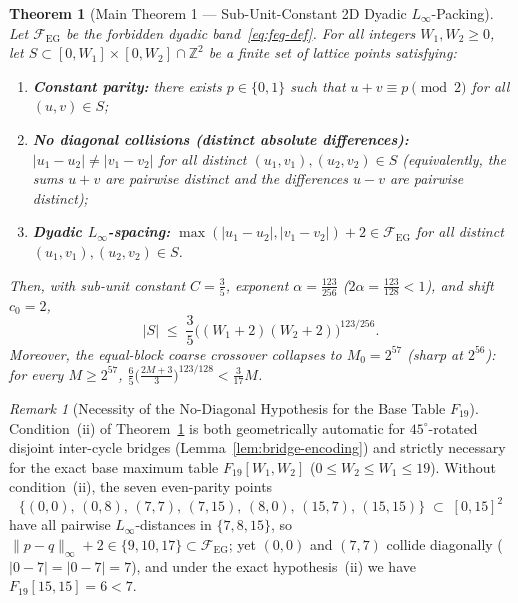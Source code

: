 \documentclass[11pt,reqno]{amsart}
\theoremstyle{plain}
\newtheorem{theorem}{Theorem}[section]
\theoremstyle{definition}
\theoremstyle{remark}
\newtheorem{remark}{Remark}[section]
\newcommand{\FEG}{\mathcal{F}_{\mathrm{EG}}}
\DeclareRobustCommand{\_}{\ifmmode\text{\textunderscore}\else\textunderscore\allowbreak\fi}
\begin{document}
\begin{theorem}[Main Theorem 1 --- Sub-Unit-Constant 2D Dyadic $L_\infty$-Packing]\label{thm:main1}
Let $\FEG$ be the forbidden dyadic band~\eqref{eq:feg-def}. For all integers $W_1, W_2 \ge 0$, let $S \subset [0, W_1] \times [0, W_2] \cap \mathbb{Z}^2$ be a finite set of lattice points satisfying:
\begin{enumerate}[label=(\roman*),leftmargin=2.2em]
  \item \textbf{Constant parity:} there exists $p \in \{0, 1\}$ such that $u + v \equiv p \pmod{2}$ for all $(u, v) \in S$;
  \item \textbf{No diagonal collisions (distinct absolute differences):} $|u_1 - u_2| \neq |v_1 - v_2|$ for all distinct $(u_1, v_1), (u_2, v_2) \in S$ (equivalently, the sums $u + v$ are pairwise distinct and the differences $u - v$ are pairwise distinct);
  \item \textbf{Dyadic $L_\infty$-spacing:} $\max(|u_1 - u_2|, |v_1 - v_2|) + 2 \in \FEG$ for all distinct $(u_1, v_1), (u_2, v_2) \in S$.
\end{enumerate}
Then, with sub-unit constant $C = \frac{3}{5}$, exponent $\alpha = \frac{123}{256}$ ($2\alpha = \frac{123}{128} < 1$), and shift $c_0 = 2$,
\begin{equation}\label{eq:packing-main}
  |S| \;\le\; \frac{3}{5}\bigl((W_1 + 2)(W_2 + 2)\bigr)^{123/256}.
\end{equation}
Moreover, the equal-block coarse crossover collapses to $M_0 = 2^{57}$ (sharp at $2^{56}$): for every $M \ge 2^{57}$, $\frac{6}{5}\bigl(\frac{2M + 3}{3}\bigr)^{123/128} < \frac{3}{17} M$.
\end{theorem}

\begin{remark}[Necessity of the No-Diagonal Hypothesis for the Base Table $F_{19}$]\label{rem:no-diag}
Condition~(ii) of Theorem~\ref{thm:main1} is both geometrically automatic for $45^\circ$-rotated disjoint inter-cycle bridges (Lemma~\ref{lem:bridge-encoding}) and strictly necessary for the exact base maximum table $F_{19}[W_1, W_2]$ ($0 \le W_2 \le W_1 \le 19$). Without condition~(ii), the seven even-parity points
\[
  \{(0, 0),\, (0, 8),\, (7, 7),\, (7, 15),\, (8, 0),\, (15, 7),\, (15, 15)\} \;\subset\; [0, 15]^2
\]
have all pairwise $L_\infty$-distances in $\{7, 8, 15\}$, so $\|p - q\|_\infty + 2 \in \{9, 10, 17\} \subset \FEG$; yet $(0, 0)$ and $(7, 7)$ collide diagonally ($|0 - 7| = |0 - 7| = 7$), and under the exact hypothesis~(ii) we have $F_{19}[15, 15] = 6 < 7$.
\end{remark}
\end{document}
